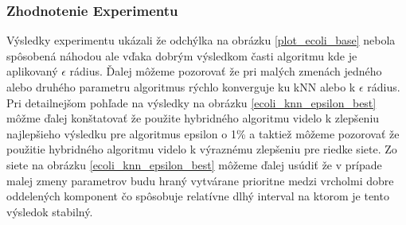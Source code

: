 \documentclass[slovak,master,dept460,male,cpp,cpdeclaration]{diploma}
\begin{document}
\subsubsection{Zhodnotenie Experimentu}
Výsledky experimentu ukázali že odchýlka na obrázku \ref{plot_ecoli_base} nebola spôsobená náhodou ale vďaka dobrým výsledkom časti algoritmu kde je aplikovaný $\epsilon$ rádius. Ďalej môžeme pozorovať že pri malých zmenách jedného alebo druhého parametru algoritmus rýchlo konverguje ku kNN alebo k $\epsilon$ rádius. Pri detailnejšom pohľade na výsledky na obrázku \ref{ecoli_knn_epsilon_best} môžme ďalej konštatovať že použite hybridného algoritmu videlo k zlepšeniu najlepšieho výsledku pre algoritmus epsilon o 1\% a taktiež môžeme pozorovať že použitie hybridného algoritmu videlo k výraznému zlepšeniu pre riedke siete. Zo siete na obrázku \ref{ecoli_knn_epsilon_best}  môžeme ďalej usúdiť že v prípade malej zmeny parametrov budu hraný vytvárane prioritne medzi vrcholmi dobre oddelených komponent čo spôsobuje relatívne dlhý interval na ktorom je tento výsledok stabilný.
\end{document}
